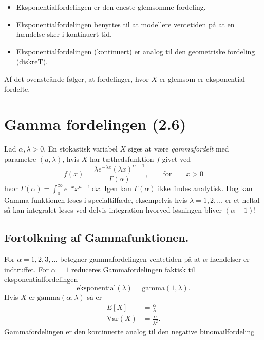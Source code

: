 \begin{itemize}
  \item Eksponentialfordelingen er den eneste glemsomme fordeling.
  \item Eksponentialfordelingen benyttes til at modellere ventetiden på at en hændelse sker i kontinuert tid.
  \item Eksponentialfordelingen (kontinuert) er analog til den geometriske fordeling (diskreT).
\end{itemize}

Af det ovensteånde følger, at fordelinger, hvor $X$ er glemsom er eksponential-fordelte. 



\section{Gamma fordelingen (2.6)} \label{afs:forgam}

\begin{definition} 
  Lad $\alpha, \lambda > 0$. En stokastisk variabel $X$ siges at være \textit{gammafordelt} med parametre $(a, \lambda)$, hvis $X$ har tæthedsfunktion $f$ givet ved
  \[ 
  f(x) = \frac{\lambda e^{-\lambda x} \left( \lambda x \right)^{\alpha-1}}{\Gamma(\alpha)}, \qquad \text{for} \qquad x > 0
  \]
  hvor $\Gamma(\alpha) = \int_{0}^{\infty} e^{-x}x^{a-1} \, \mathrm{d}x$. Igen kan $\Gamma(\alpha)$ ikke findes analytisk. Dog kan Gamma-funktionen løses i specialtilfæde, eksempelvis hvis $\lambda = 1, 2, \ldots$ er et heltal så kan integralet løses ved delvis integration hvorved løsningen bliver $(\alpha-1)!$
\end{definition}

\subsection{Fortolkning af Gammafunktionen.}
For $\alpha = 1, 2, 3, \ldots $ betegner gammafordelingen ventetiden på at $\alpha$ hændelser er indtruffet. For $\alpha = 1$ reduceres Gammafordelingen faktisk til eksponentialfordelingen
\[ 
\mathrm{eksponential}(\lambda) = \mathrm{gamma}(1, \lambda)
.\]
Hvis $X$ er $\mathrm{gamma}(\alpha, \lambda)$ så er
\begin{align*}
  E[X] &= \frac{\alpha}{\lambda} \\
  \mathrm{Var}(X) &= \frac{\alpha}{\lambda^2}
.\end{align*}
Gammafordelingen er den kontinuerte analog til den negative binomailfordeling


